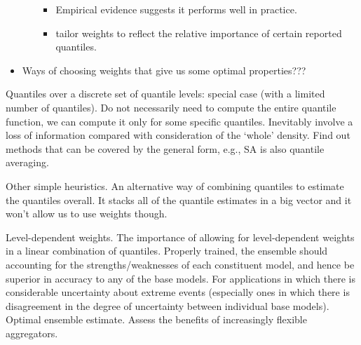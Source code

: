 \documentclass[11pt]{article}
\begin{document}
\begin{itemize}
\begin{itemize}
\begin{itemize}
      \item Empirical evidence suggests it performs well in practice.
      \item \cite{Grushka-Cockayne2017-eg} tailor weights to reflect the relative importance of certain reported quantiles.
    \end{itemize}
  \end{itemize}
  \item Ways of choosing weights that give us some optimal properties???
\end{itemize}


Quantiles over a discrete set of quantile levels: special case (with a limited number of quantiles). Do not necessarily need to compute the entire quantile function, we can compute it only for some specific quantiles. Inevitably involve a loss of information compared with consideration of the `whole' density. Find out methods that can be covered by the general form, e.g., SA \citep[e.g.,][]{Smyl2019-av,Brooks2020-sg} is also quantile averaging.

Other simple heuristics. An alternative way of combining quantiles to estimate the quantiles overall. It stacks all of the quantile estimates in a big vector and it won't allow us to use weights though.

Level-dependent weights. The importance of allowing for level-dependent weights \citep{Brooks2020-sg,Browell2020-pa} in a linear combination of quantiles. Properly trained, the ensemble should accounting for the strengths/weaknesses of each constituent model, and hence be superior in accuracy to any of the base models. For applications in which there is considerable uncertainty about extreme events (especially ones in which there is disagreement in the degree of uncertainty between individual base models). Optimal ensemble estimate. Assess the benefits of increasingly flexible aggregators.
\end{document}
